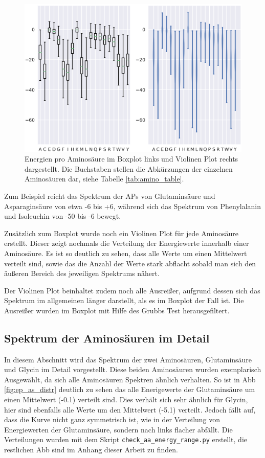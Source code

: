 \begin{figure}
    \centering
    \includegraphics[width=.99\textwidth]{images/BoxPlot_energy_rages.png}
    \caption{Energien pro Aminosäure im Boxplot links und Violinen Plot rechts dargestellt. Die Buchstaben stellen die Abkürzungen der einzelnen Aminosäuren dar, siehe Tabelle \ref{tab:amino_table}.}
    \label{fig:energy_ranges}
\end{figure}

Zum Beispiel reicht das Spektrum der \ac{APs} von Glutaminsäure und Asparaginsäure von etwa -6 bis +6, während sich das Spektrum von Phenylalanin und Isoleuchin von -50 bis -6 bewegt. 

Zusätzlich zum Boxplot wurde noch ein Violinen Plot für jede Aminosäure erstellt. Dieser zeigt nochmals die Verteilung der Energiewerte innerhalb einer Aminosäure. Es ist so deutlich zu sehen, dass alle Werte um einen Mittelwert verteilt sind, sowie das die Anzahl der Werte stark abflacht sobald man sich den äußeren Bereich des jeweiligen Spektrums nähert.

Der Violinen Plot beinhaltet zudem noch alle Ausreißer, aufgrund dessen sich das Spektrum im allgemeinen länger darstellt, als es im Boxplot der Fall ist. Die Ausreißer wurden im Boxplot mit Hilfe des Grubbs Test\cite{Jain.2010} herausgefiltert. 


\subsection{Spektrum der Aminosäuren im Detail}
In diesem Abschnitt wird das Spektrum der zwei Aminosäuren, Glutaminsäure und Glycin im Detail vorgestellt. Diese beiden Aminosäuren wurden exemplarisch Ausgewählt, da sich alle Aminosäuren Spektren ähnlich verhalten. So ist in \ac{Abb} \ref{fig:ep_as_distr} deutlich zu sehen das alle Enerigewerte der Glutaminsäure um einen Mittelwert (-0.1) verteilt sind. Dies verhält sich sehr ähnlich für Glycin, hier sind ebenfalls alle Werte um den Mittelwert (-5.1) verteilt. Jedoch fällt auf, dass die Kurve nicht ganz symmetrisch ist, wie in der Verteilung von Energiewerten der Glutaminsäure, sondern nach links flacher abfällt. Die Verteilungen wurden mit dem Skript \texttt{check\_aa\_energy\_range.py} erstellt, die restlichen \ac{Abb} sind im Anhang dieser Arbeit zu finden. 

